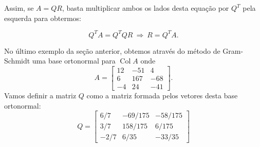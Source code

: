 Assim, se $A=QR$, basta multiplicar ambos os lados desta equação por $Q^T$ pela esquerda para obtermos:

\begin{equation}Q^T A = Q^T Q R \ \Longrightarrow \ R= Q^T A.\end{equation}






\vspace{0.3cm}



No último exemplo da seção anterior, obtemos através do método de Gram-Schmidt uma base ortonormal para $\operatorname{Col} A$
onde
\begin{equation}
A =
\begin{bmatrix}
12 & -51 & 4 \\
6 & 167 & -68 \\
-4 & 24 & -41
\end{bmatrix}.
\end{equation}
Vamos definir a matriz $Q$ como a matriz formada pelos vetores desta base ortonormal:
\begin{equation}
Q =
\begin{bmatrix}
6/7 & -69/175 & -58/175 \\
3/7 & 158/175 & 6/175   \\
-2/7& 6/35   &-33/35
\end{bmatrix}
\end{equation}

